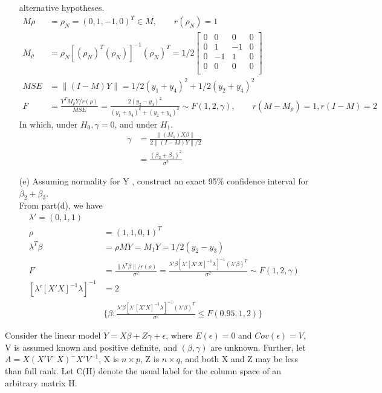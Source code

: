 \documentclass{homework}
\begin{document}
\begin{itemize}
alternative hypotheses.\\
\begin{align*}
    M\rho &=  \rho_N= (0, 1, -1, 0)^T \in M, \qquad r(\rho_N) = 1\\
    M_{\rho} &= \rho_N [(\rho_N)^T (\rho_N)]^{-1} (\rho_N)^T=1/2 \begin{bmatrix}
           0  & 0 & 0 & 0  \\
           0 &  1 & -1 & 0\\
           0  & -1 & 1 & 0 \\
           0 & 0 & 0 & 0\\
         \end{bmatrix}\\
    MSE &= \lVert (I-M)Y \rVert = 1/2 (y_1+y_4)^2 + 1/2 (y_2 + y_4)^2 \\
    F &= \frac{Y^T M_{\rho} Y/r(\rho)}{MSE} = \frac{2(y_2 - y_3)^2}{(y_1+y_4)^2 + (y_2 + y_4)^2} \sim F(1,2, \gamma), \qquad r(M-M_{\rho}) = 1, r(I-M) = 2
\end{align*} 
In which, under $H_0, \gamma = 0$, and under $H_1$.
\begin{align*}
    \gamma &= \frac{\lVert (M_1) X\beta \rVert}{2 \lVert (I-M)Y \rVert/2}\\
    &= \frac{(\beta_2 + \beta_3)^2}{\sigma^2}
\end{align*} 
\item[(e)] Assuming normality for Y , construct an exact 95$\%$ confidence interval for $\beta_2 + \beta_3$.\\
From part(d), we have
\begin{align*}
 \lambda' = (0, 1, 1)\\
 \rho &= (1, 1, 0, 1)^T\\
 \lambda^T \beta &=  \rho M Y = M_1 Y= 1/2 (y_2 - y_3)\\
  F &= \frac{\lVert \lambda^T \beta \rVert/r(\rho)}{\sigma^2} = \frac{\lambda'\beta [\lambda'[X'X]^{-1} \lambda]^{-1} (\lambda'\beta)^T }{\sigma^2} \sim F(1,2, \gamma)\\
  [\lambda'[X'X]^{-1} \lambda]^{-1} & = 2\\
 &\{\beta: \frac{\lambda'\beta [\lambda'[X'X]^{-1} \lambda]^{-1} (\lambda'\beta)^T }{\sigma^2} \leq F(0.95, 1,2) \} 
\end{align*} 

\end{itemize}
\exercise
Consider the linear model $Y = X\beta + Z\gamma + \epsilon$, where $E(\epsilon) = 0$ and $Cov(\epsilon) = V$, V is assumed known and positive definite, and $(\beta, \gamma)$ are unknown. Further, let $A =X(X'V^-X)^-X'V^{-1}$, X is $n \times p$, Z is $n \times q$, and both X and Z may be less than full rank. Let C(H) denote the usual label for the column space of an arbitrary matrix H.
\end{document}
